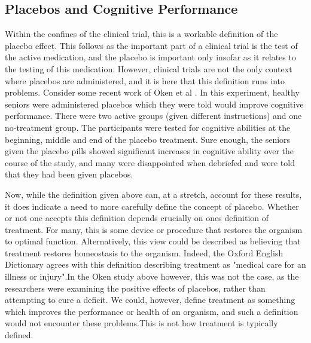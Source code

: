 \subsection{Placebos and Cognitive Performance}
\label{sec:plac-cogn-perf}
Within the confines of the clinical trial, this is a workable definition of the placebo effect. This follows as the important part of a clinical trial is the test of the active medication, and the placebo is important only insofar as it relates to the testing of this medication. However, clinical trials are not the only context where placebos are administered, and it is here that this definition runs into problems. Consider some recent work of Oken et al \cite{Oken2008}. In this experiment, healthy seniors were administered placebos which they were told would improve cognitive performance. There were two active groups (given different instructions) and one no-treatment group. The participants were tested for cognitive abilities at the beginning, middle and end of the placebo treatment. Sure enough, the seniors given the placebo pills showed significant increases in cognitive ability over the course of the study, and many were disappointed when debriefed and were told that they had been given placebos.

Now, while the definition given above can, at a stretch, account for these results, it does indicate a need to more carefully define the concept of placebo. Whether or not one accepts this definition depends crucially on ones definition of treatment. For many, this is some device or procedure that restores the organism to optimal function. Alternatively, this view could be described as believing that treatment restores homeostasis to the organism. Indeed, the Oxford English Dictionary agrees with this definition describing treatment as "medical care for an illness or injury".In the Oken study above however, this was not the case, as the researchers were examining the positive effects of placebos, rather than attempting to cure a deficit. We could, however, define treatment as something which improves the performance or health of an organism, and such a definition would not encounter these problems.This is not how treatment is typically defined. 

